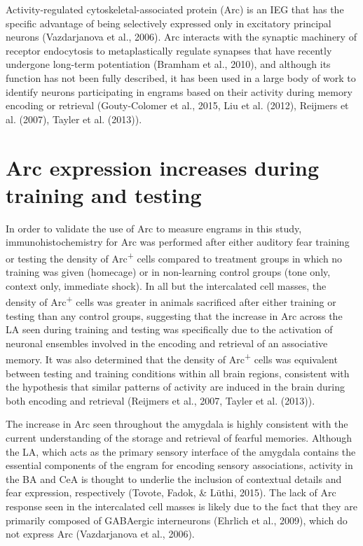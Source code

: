 \documentclass[12pt,a4paper,]{report}
\begin{document}
Activity-regulated cytoskeletal-associated protein (Arc) is an IEG that
has the specific advantage of being selectively expressed only in
excitatory principal neurons (Vazdarjanova et al., 2006). Arc interacts
with the synaptic machinery of receptor endocytosis to metaplastically
regulate synapses that have recently undergone long-term potentiation
(Bramham et al., 2010), and although its function has not been fully
described, it has been used in a large body of work to identify neurons
participating in engrams based on their activity during memory encoding
or retrieval (Gouty-Colomer et al., 2015, Liu et al. (2012), Reijmers et
al. (2007), Tayler et al. (2013)).

\section{Arc expression increases during training and
testing}\label{arc-expression-increases-during-training-and-testing}

In order to validate the use of Arc to measure engrams in this study,
immunohistochemistry for Arc was performed after either auditory fear
training or testing the density of Arc\textsuperscript{+} cells compared
to treatment groups in which no training was given (homecage) or in
non-learning control groups (tone only, context only, immediate shock).
In all but the intercalated cell masses, the density of
Arc\textsuperscript{+} cells was greater in animals sacrificed after
either training or testing than any control groups, suggesting that the
increase in Arc across the LA seen during training and testing was
specifically due to the activation of neuronal ensembles involved in the
encoding and retrieval of an associative memory. It was also determined
that the density of Arc\textsuperscript{+} cells was equivalent between
testing and training conditions within all brain regions, consistent
with the hypothesis that similar patterns of activity are induced in the
brain during both encoding and retrieval (Reijmers et al., 2007, Tayler
et al. (2013)).

The increase in Arc seen throughout the amygdala is highly consistent
with the current understanding of the storage and retrieval of fearful
memories. Although the LA, which acts as the primary sensory interface
of the amygdala contains the essential components of the engram for
encoding sensory associations, activity in the BA and CeA is thought to
underlie the inclusion of contextual details and fear expression,
respectively (Tovote, Fadok, \& Lüthi, 2015). The lack of Arc response
seen in the intercalated cell masses is likely due to the fact that they
are primarily composed of GABAergic interneurons (Ehrlich et al., 2009),
which do not express Arc (Vazdarjanova et al., 2006).
\end{document}
